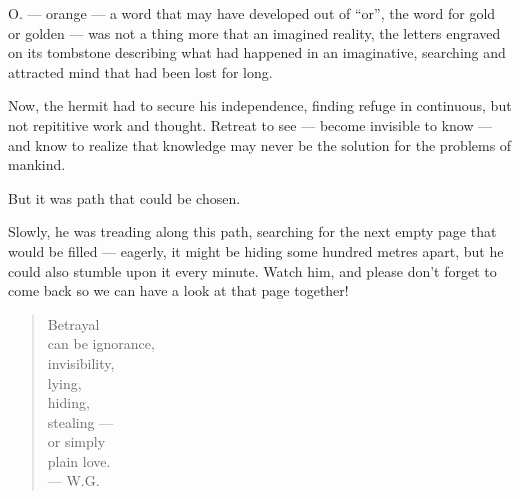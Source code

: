 O. --- orange --- a word that may have developed out of \enquote{or}, the word for gold or golden --- was not a thing more that an imagined reality, the letters engraved on its tombstone describing what had happened in an imaginative, searching and attracted mind that had been lost for long.

Now, the hermit had to secure his independence, finding refuge in continuous, but not repititive work and thought. Retreat to see --- become invisible to know --- and know to realize that knowledge may never be the solution for the problems of mankind.

But it was path that could be chosen.

Slowly, he was treading along this path, searching for the next empty page that would be filled --- eagerly, it might be hiding some hundred metres apart, but he could also stumble upon it every minute. 
Watch him, and please don't forget to come back so we can have a look at that page together!

\begin{verse}
Betrayal \\
can be ignorance, \\
invisibility, \\
lying, \\
hiding, \\
stealing --- \\
or simply \\
plain love. \\
--- W.G.
\end{verse}


